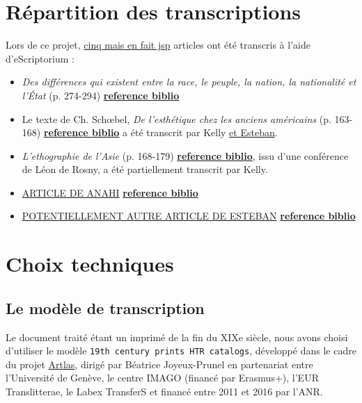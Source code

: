 \documentclass{article}
\begin{document}
	
	
	\section{Répartition des transcriptions}
	
	Lors de ce projet, \underline{cinq mais en fait jsp} articles ont été transcris à l'aide d'eScriptorium :
	\begin{itemize}
		\item \textit{Des différences qui existent entre la race, le peuple, la nation, la nationalité et l'État} (p. 274-294) \underline{\textbf{reference biblio}}
		\item Le texte de Ch. Schœbel, \textit{De l’esthétique chez les anciens américains} (p. 163-168) \underline{\textbf{reference biblio}} a été transcrit par Kelly \underline{et Esteban}.
		\item \textit{L'ethographie de l'Asie} (p. 168-179) \underline{\textbf{reference biblio}}, issu d'une conférence de Léon de Rosny, a été partiellement transcrit par Kelly.
		\item \underline{ARTICLE DE ANAHI} \underline{\textbf{reference biblio}}
		\item \underline{POTENTIELLEMENT AUTRE ARTICLE DE ESTEBAN} \underline{\textbf{reference biblio}}
	\end{itemize}
	
	
	
	\section{Choix techniques}
	
	\subsection{Le modèle de transcription}
	
	Le document traité étant un imprimé de la fin du XIXe siècle, nous avons choisi d'utiliser le modèle \texttt{19th century prints HTR catalogs}, développé dans le cadre du projet \href{https://artlas.huma-num.fr/fr/}{Artlas}, dirigé par Béatrice Joyeux-Prunel en partenariat entre l'Université de Genève, le centre IMAGO (financé par Erasmus+), l'EUR Translitterae, le Labex TransferS et financé entre 2011 et 2016 par l'ANR.
	
\end{document}
